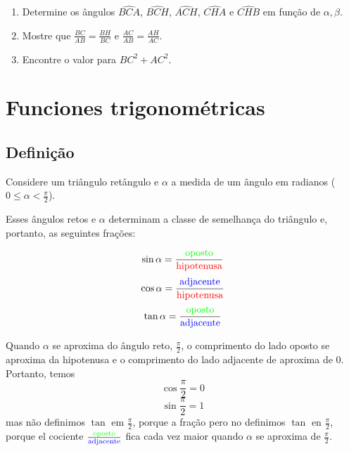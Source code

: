 \begin{enumerate}
\item Determine os ângulos $\widehat{BCA}$, 
  $\widehat{BCH}$, $\widehat{ACH}$, $\widehat{CHA}$ e $\widehat{CHB}$
  em função de $\alpha, \beta$.
\item Mostre que
  $\frac{BC}{AB} = \frac{BH}{BC}$ e
  $\frac{AC}{AB} = \frac{AH}{AC}$.
\item Encontre o valor para ${BC}^2 + {AC}^2$.
\end{enumerate}

\section{Funciones trigonométricas}

\subsection{Definição}

Considere um triângulo retângulo e $\alpha$ a medida de um ângulo
em radianos ($0 \leq \alpha < \frac{\pi}{2}$).

\begin{center}
\end{center}

Esses ângulos retos e $\alpha$ determinam a classe de semelhança do triângulo
e, portanto, as seguintes frações:

$$
\sin \alpha = \frac{\color{green}{\text{oposto}}}
{\text{\color{red}{\text{hipotenusa}}}}
$$
$$
\cos \alpha = \frac{\color{blue}{\text{adjacente}}}
{\text{\color{red}{\text{hipotenusa}}}}
$$
$$
\tan \alpha = \frac{\color{green}{\text{oposto}}}
{\text{\color{blue}{\text{adjacente}}}}
$$

Quando $\alpha$ se aproxima do ângulo reto, $\frac{\pi}{2}$,
o comprimento do lado oposto se aproxima da hipotenusa e
o comprimento do lado adjacente de aproxima de 0. Portanto, temos
$$
\cos \frac{\pi}{2} = 0
$$
$$
\sin \frac{\pi}{2} = 1
$$
mas não definimos $\tan$ em $\frac{\pi}{2}$, porque a fração
pero no definimos $\tan$ en $\frac{\pi}{2}$, porque el cociente
$\frac{\color{green}{\text{oposto}}}
{\text{\color{blue}{\text{adjacente}}}}$ fica cada vez maior
quando $\alpha$ se aproxima de $\frac{\pi}{2}$.

